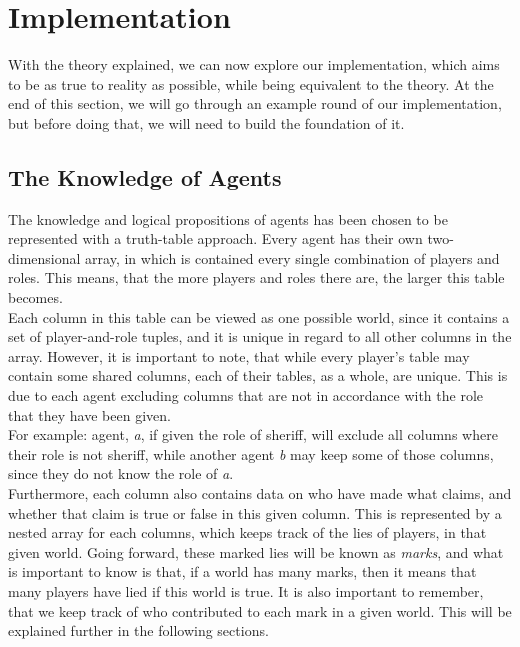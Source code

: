 \section{Implementation}\label{sec:implementation}
With the theory explained, we can now explore our implementation, which aims to 
be as true to reality as possible, while being equivalent to the theory. At the 
end of this section, we will go through an example round of our implementation, 
but before doing that, we will need to build the foundation of it.
\subsection{The Knowledge of Agents}\label{TheKnowledgeOfAgents}
The knowledge and logical propositions of agents has been chosen to be 
represented with a truth-table approach. Every agent has their own 
two-dimensional array, in which is contained every single combination of 
players and roles. This means, that the more players and roles there are, the 
larger this table becomes.\\ 
Each column in this table can be viewed as one possible world, since it 
contains a set of player-and-role tuples, and it is unique in regard to all 
other columns in the array. However, it is important to note, that while every 
player's table may contain some shared columns, each of their tables, as a 
whole, are unique. This is due to each agent excluding columns that are not in 
accordance with the role that they have been given.\\ 
For example: agent, \textit{a}, if given the role of sheriff, will exclude all 
columns where their role is not sheriff, while another agent \textit{b} may 
keep some of those columns, since they do not know the role of \textit{a}.\\
Furthermore, each column also contains data on who have made what claims, and 
whether that claim is true or false in this given column. This is represented 
by a nested array for each columns, which keeps track of the lies of players, 
in that given world. Going forward, these marked lies will be known as 
\textit{marks}, and what is important to know is that, if a world has many 
marks, then it means that many players have lied if this world is true. It is 
also important to remember, that we keep track of who contributed to each mark 
in a given world. This will be explained further in the following sections.

